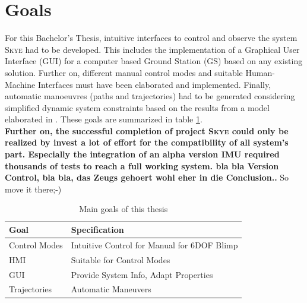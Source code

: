 \section{Goals}
\label{sec:goals}
For this Bachelor's Thesis, intuitive interfaces to control and observe the system \textsc{Skye} had to be developed. This includes the implementation of a Graphical User Interface (GUI) for a computer based Ground Station (GS) based on any existing solution. Further on, different manual control modes and suitable Human-Machine Interfaces must have been elaborated and implemented. Finally, automatic manoeuvres  (paths and trajectories) had to be generated considering simplified dynamic system constraints based on the results from a model elaborated in \cite{weichart}. These goals are summarized in table \ref{tab:goals}. \\
\textbf{
Further on, the successful completion of project \textsc{Skye} could only be realized by invest a lot of effort for the compatibility of all system's part. Especially the integration of an alpha version IMU required thousands of tests to reach a full working system. bla bla Version Control, bla bla, das Zeugs gehoert wohl eher in die Conclusion..} So move it there;-)


\begin{table}[H]
\begin{center}
 \begin{tabular}{ll}
 \hline
 Goal & Specification  \\ \hline \hline
 Control Modes 	& 	Intuitive Control for Manual for 6DOF Blimp \\
 HMI			&	Suitable for Control Modes \\
 GUI         	& 	Provide System Info, Adapt Properties \\
 Trajectories   & 	Automatic Maneuvers \\
 \hline
 \end{tabular}
 \caption{Main goals of this thesis}\vspace{1ex}
 \label{tab:goals}
\end{center}
\end{table}


